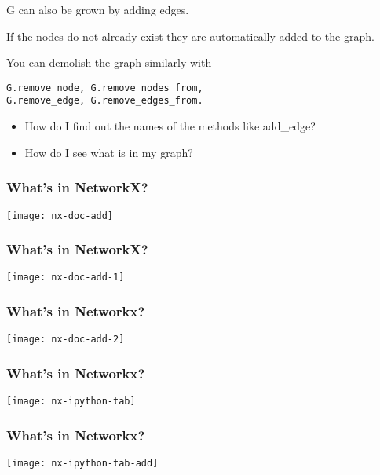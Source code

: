 \begin{frame}[fragile]

G can also be grown by adding edges.

\begin{block}{}


\end{block}

If the nodes do not already exist they are automatically added to the graph.

You can demolish the graph similarly with
\begin{verbatim}
G.remove_node, G.remove_nodes_from,
G.remove_edge, G.remove_edges_from.
\end{verbatim}

\end{frame}

\begin{frame}
\Large
\begin{itemize}

\item How do I find out the names of the methods like add\_edge?

\item How do I see what is in my graph?

\end{itemize}
\end{frame}

\begin{frame}
\frametitle{What's in NetworkX?}
\centerline{\texttt{[image: nx-doc-add]}}
\end{frame}

\begin{frame}
\frametitle{What's in NetworkX?}
\centerline{\texttt{[image: nx-doc-add-1]}}
\end{frame}

\begin{frame}
\frametitle{What's in Networkx?}
\centerline{\texttt{[image: nx-doc-add-2]}}
\end{frame}

\begin{frame}
\frametitle{What's in Networkx?}
\centerline{\texttt{[image: nx-ipython-tab]}}
\end{frame}

\begin{frame}
\frametitle{What's in Networkx?}
\centerline{\texttt{[image: nx-ipython-tab-add]}}
\end{frame}


